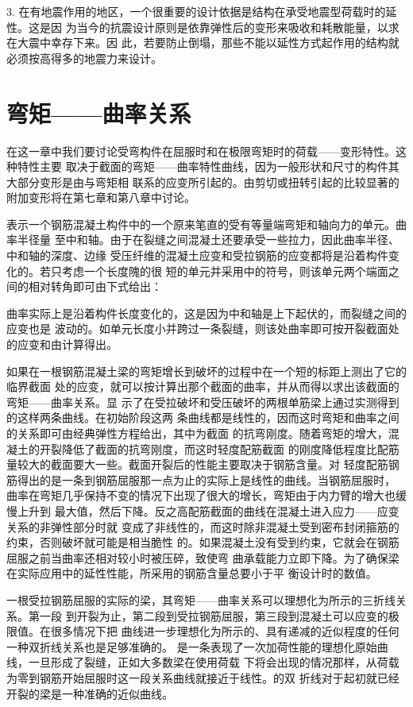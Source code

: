 \documentclass[12pt,a4paper]{book}
\begin{document}
3. 在有地震作用的地区，一个很重要的设计依据是结构在承受地震型荷载时的延性。这是因
为当今的抗震设计原则是依靠弹性后的变形来吸收和耗散能量，以求在大震中幸存下来。因
此，若要防止倒塌，那些不能以延性方式起作用的结构就必须按高得多的地震力来设计。

\section{弯矩——曲率关系}

在这一章中我们要讨论受弯构件在屈服时和在极限弯矩时的荷载——变形特性。这种特性主要
取决于截面的弯矩——曲率特性曲线，因为一般形状和尺寸的构件其大部分变形是由与弯矩相
联系的应变所引起的。由剪切或扭转引起的比较显著的附加变形将在第七章和第八章中讨论。

表示一个钢筋混凝土构件中的一个原来笔直的受有等量端弯矩和轴向力的单元。曲率半径量
至中和轴。由于在裂缝之间混凝土还要承受一些拉力，因此曲率半径、中和轴的深度、边缘
受压纤维的混凝土应变和受拉钢筋的应变都将是沿着构件变化的。若只考虑一个长度隗的很
短的单元并采用中的符号，则该单元两个端面之间的相对转角即可由下式给出：

曲率实际上是沿着构件长度变化的，这是因为中和轴是上下起伏的，而裂缝之间的应变也是
波动的。如单元长度小并跨过一条裂缝，则该处曲率即可按开裂截面处的应变和由计算得出。

如果在一根钢筋混凝土梁的弯矩增长到破坏的过程中在一个短的标距上测出了它的临界截面
处的应变，就可以按计算出那个截面的曲率，并从而得以求出该截面的弯矩——曲率关系。显
示了在受拉破坏和受压破坏的两根单筋梁上通过实测得到的这样两条曲线。在初始阶段这两
条曲线都是线性的，因而这时弯矩和曲率之间的关系即可由经典弹性方程给出，其中为截面
的抗弯刚度。随着弯矩的增大，混凝土的开裂降低了截面的抗弯刚度，而这时轻度配筋截面
的刚度降低程度比配筋量较大的截面要大一些。截面开裂后的性能主要取决于钢筋含量。对
轻度配筋钢筋得出的是一条到钢筋屈服那一点为止的实际上是线性的曲线。当钢筋屈服时，
曲率在弯矩几乎保持不变的情况下出现了很大的增长，弯矩由于内力臂的增大也缓慢上升到
最大值，然后下降。反之高配筋截面的曲线在混凝土进入应力——应变关系的非弹性部分时就
变成了非线性的，而这时除非混凝土受到密布封闭箍筋的约束，否则破坏就可能是相当脆性
的。如果混凝土没有受到约束，它就会在钢筋屈服之前当曲率还相对较小时被压碎，致使弯
曲承载能力立即下降。为了确保梁在实际应用中的延性性能，所采用的钢筋含量总要小于平
衡设计时的数值。

一根受拉钢筋屈服的实际的梁，其弯矩——曲率关系可以理想化为所示的三折线关系。第一段
到开裂为止，第二段到受拉钢筋屈服，第三段到混凝土可以应变的极限值。在很多情况下把
曲线进一步理想化为所示的、具有递减的近似程度的任何一种双折线关系也是足够准确的。
是一条表现了一次加荷性能的理想化原始曲线，一旦形成了裂缝，正如大多数梁在使用荷载
下将会出现的情况那样，从荷载为零到钢筋开始屈服时这一段关系曲线就接近于线性。的双
折线对于起初就已经开裂的梁是一种准确的近似曲线。
\end{document}
